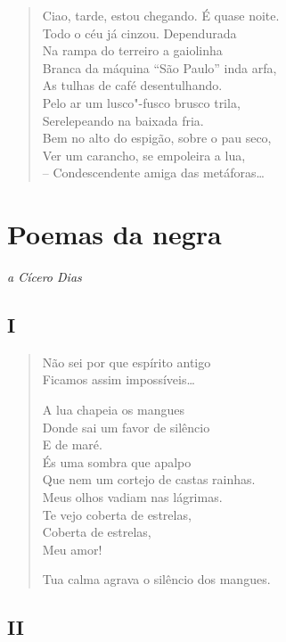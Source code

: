 \begin{verse}
Ciao, tarde, estou chegando. É quase noite.\\
Todo o céu já cinzou. Dependurada\\
Na rampa do terreiro a gaiolinha\\
Branca da máquina ``São Paulo'' inda arfa,\\
As tulhas de café desentulhando.\\
Pelo ar um lusco"-fusco brusco trila,\\
Serelepeando na baixada fria.\\
Bem no alto do espigão, sobre o pau seco,\\
Ver um carancho, se empoleira a lua,\\
-- Condescendente amiga das metáforas\ldots{}
\end{verse}

\chapter[Poemas da negra]{Poemas da negra }

\begin{flushright}
\emph{a Cícero Dias}
\end{flushright}

\section*{I}

\begin{verse}
Não sei por que espírito antigo\\
Ficamos assim impossíveis\ldots{}

A lua chapeia os mangues\\
Donde sai um favor de silêncio\\
E de maré.\\
És uma sombra que apalpo\\
Que nem um cortejo de castas rainhas.\\
Meus olhos vadiam nas lágrimas.\\
Te vejo coberta de estrelas,\\
Coberta de estrelas,\\
Meu amor!

Tua calma agrava o silêncio dos mangues.
\end{verse}

\pagebreak
\section*{II}

